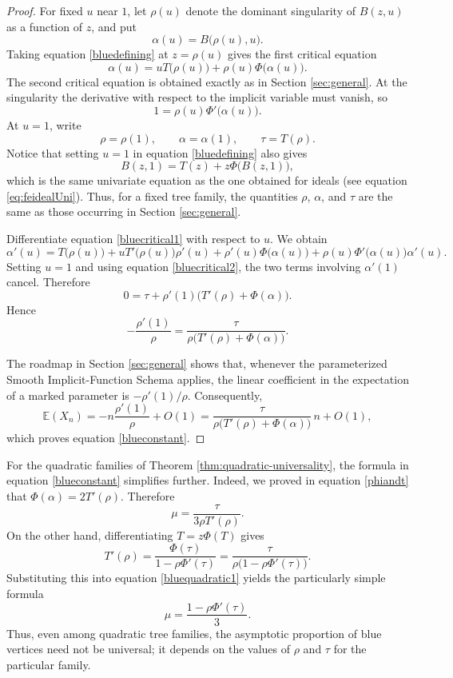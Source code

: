 \documentclass[10pt,a4paper]{amsart}
\theoremstyle{remark}
\begin{document}
\begin{proof}
For fixed $u$ near $1$, let $\rho(u)$ denote the dominant singularity of
$B(z,u)$ as a function of $z$, and put
\[
\alpha(u)=B\big(\rho(u),u\big).
\]
Taking equation \eqref{bluedefining} at $z=\rho(u)$ gives the first critical equation
\begin{equation}\label{bluecritical1}
\alpha(u)
=
u T\big(\rho(u)\big)+\rho(u)\Phi\big(\alpha(u)\big).
\end{equation}
The second critical equation is obtained exactly as in Section \ref{sec:general}.  At the
singularity the derivative with respect to the implicit variable must vanish,
so
\begin{equation}\label{bluecritical2}
1=\rho(u)\Phi'\big(\alpha(u)\big).
\end{equation}
At $u=1$, write
\[
\rho=\rho(1),\qquad \alpha=\alpha(1),\qquad \tau=T(\rho).
\]
Notice that setting $u=1$ in equation \eqref{bluedefining} also gives
\[
B(z,1)=T(z)+z\Phi\big(B(z,1)\big),
\]
which is the same univariate equation as the one obtained for ideals
(see equation \eqref{eq:feidealUni}). Thus,
for a fixed tree family, the quantities $\rho$, $\alpha$, and $\tau$ are the
same as those occurring in Section \ref{sec:general}.

Differentiate equation \eqref{bluecritical1} with respect to $u$.  We obtain
\[
\alpha'(u)
=
T\big(\rho(u)\big)
+uT'\big(\rho(u)\big)\rho'(u)
+\rho'(u)\Phi\big(\alpha(u)\big)
+\rho(u)\Phi'\big(\alpha(u)\big)\alpha'(u).
\]
Setting $u=1$ and using equation \eqref{bluecritical2}, the two terms involving
$\alpha'(1)$ cancel.  Therefore
\[
0
=
\tau
+\rho'(1)\bigl(T'(\rho)+\Phi(\alpha)\bigr).
\]
Hence
\[
-\frac{\rho'(1)}{\rho}
=
\frac{\tau}
{\rho\bigl(T'(\rho)+\Phi(\alpha)\bigr)}.
\]

The roadmap in Section \ref{sec:general} shows that, whenever the parameterized Smooth
Implicit-Function Schema applies, the linear coefficient in the expectation
of a marked parameter is $-\rho'(1)/\rho$. Consequently,
\[
\mathbb E(X_n)
=
-n\frac{\rho'(1)}{\rho}+O(1)
=
\frac{\tau}
{\rho\bigl(T'(\rho)+\Phi(\alpha)\bigr)}\,n+O(1),
\]
which proves equation \eqref{blueconstant}.
\end{proof}

For the quadratic families of Theorem \ref{thm:quadratic-universality}, the formula in equation
\eqref{blueconstant} simplifies further.  Indeed, we proved in
equation \eqref{phiandt} that $\Phi(\alpha)=2T'(\rho)$.
Therefore
\begin{equation}\label{bluequadratic1}
\mu=\frac{\tau}{3\rho T'(\rho)}.
\end{equation}
On the other hand, differentiating $T=z\Phi(T)$ gives
\[
T'(\rho)
=
\frac{\Phi(\tau)}{1-\rho\Phi'(\tau)}
=
\frac{\tau}{\rho\bigl(1-\rho\Phi'(\tau)\bigr)}.
\]
Substituting this into equation \eqref{bluequadratic1} yields the particularly simple
formula
\begin{equation}\label{bluequadratic2}
{
\mu=\frac{1-\rho\Phi'(\tau)}{3}.
}
\end{equation}
Thus, even among quadratic tree families, the asymptotic proportion of blue
vertices need not be universal; it depends on the values of $\rho$ and
$\tau$ for the particular family.
\end{document}
